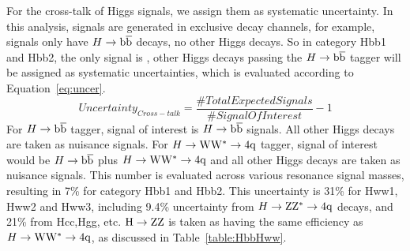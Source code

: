 For the cross-talk of Higgs signals, we assign them as systematic uncertainty. 
In this analysis, signals are generated in exclusive decay channels, for example, \HbbVqq signals only have 
$H\to\mathrm{b\overline{b}}$ decays, no other Higgs decays. 
So in category Hbb1 and Hbb2,  the only signal is \HbbVqq, other Higgs decays passing the $H\to\mathrm{b\overline{b}}$ tagger will 
be assigned as systematic uncertainties, which is evaluated according to Equation~\ref{eq:uncer}. 
\begin{equation}
Uncertainty_{Cross-talk} = \frac{\#TotalExpectedSignals}{\#SignalOfInterest} - 1 
\label{eq:uncer}
\end{equation}
\noindent For $H\to\mathrm{b\overline{b}}$ tagger, signal of interest is $H\to\mathrm{b\overline{b}}$ signals. All other Higgs decays are taken as nuisance signals.
For $H\to{\rm W}{\rm W}^*\to4{\rm q}$ tagger,  signal of interest would be $H\to\mathrm{b\overline{b}}$ plus $H\to{\rm W}{\rm W}^*\to4{\rm q}$ and all other Higgs decays are taken as 
nuisance signals.  This number is evaluated across various resonance signal masses, resulting in 7\% for category Hbb1
and Hbb2. This uncertainty is 31\% for Hww1, Hww2 and Hww3, including 9.4\% uncertainty from $H\to{\rm Z}{\rm Z}^*\to4{\rm q}$ decays, and 21\% from 
Hcc,Hgg, etc.  ${\rm H \to ZZ}$ is taken as having the same efficiency as $H\to{\rm W}{\rm W}^*\to4{\rm q}$, as discussed in Table~\ref{table:HbbHww}.   


